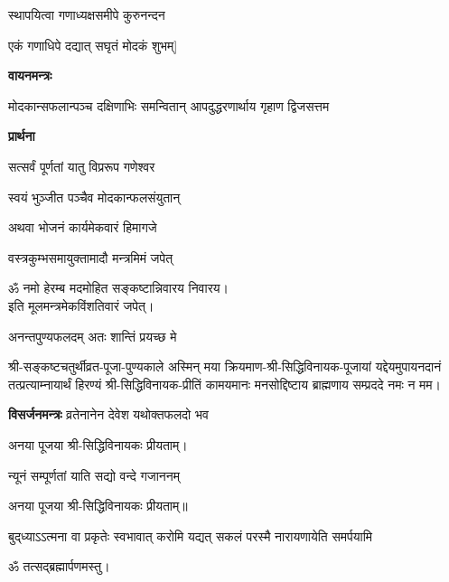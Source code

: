 \begin{center}
\twolineshloka*
{[अथैकविंशतिं गृह्य मोदकान् घृतपाचितान्}
{स्थापयित्वा गणाध्यक्षसमीपे कुरुनन्दन}

{एकं गणाधिपे दद्यात् सघृतं मोदकं शुभम्]}

\centerline{\textbf{वायनमन्त्रः}}

{मोदकान्सफलान्पञ्च दक्षिणाभिः समन्वितान्}
{आपदुद्धरणार्थाय गृहाण द्विजसत्तम}

\centerline{\textbf{प्रार्थना}}

{सत्सर्वं पूर्णतां यातु विप्ररूप गणेश्वर}

{स्वयं भुञ्जीत पञ्चैव मोदकान्फलसंयुतान्}

{अथवा भोजनं कार्यमेकवारं हिमागजे}

{वस्त्रकुम्भसमायुक्तामादौ मन्त्रमिमं जपेत्}

ॐ नमो हेरम्ब मदमोहित सङ्कष्टान्निवारय निवारय।\\
इति मूलमन्त्रमेकविंशतिवारं जपेत्।
\medskip


{अनन्तपुण्यफलदम् अतः शान्तिं प्रयच्छ मे}

श्री-सङ्कष्टचतुर्थीव्रत-पूजा-पुण्यकाले अस्मिन् मया क्रियमाण-श्री-सिद्धिविनायक-पूजायां
यद्देयमुपायनदानं तत्प्रत्याम्नायार्थं हिरण्यं श्री-सिद्धिविनायक-प्रीतिं
कामयमानः मनसोद्दिष्टाय ब्राह्मणाय सम्प्रददे नमः न मम।

\textbf{विसर्जनमन्त्रः}
{व्रतेनानेन देवेश यथोक्तफलदो भव}

अनया पूजया श्री-सिद्धिविनायकः प्रीयताम्। 


{न्यूनं सम्पूर्णतां याति सद्यो वन्दे गजाननम्} 

अनया पूजया श्री-सिद्धिविनायकः प्रीयताम्॥ 

{बुद्‌ध्याऽऽत्मना वा प्रकृतेः स्वभावात्}
{करोमि यद्यत् सकलं परस्मै}
{नारायणायेति समर्पयामि}

ॐ तत्सद्ब्रह्मार्पणमस्तु।

\end{center}

